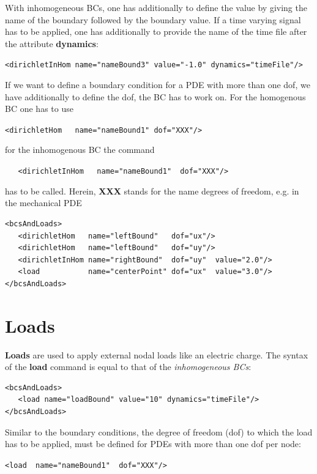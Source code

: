 With inhomogeneous BCs, one has additionally to define the value by
giving the name of the boundary followed by the boundary value. If a
time varying signal has to be applied, one has additionally to provide
the name of the time file after the attribute {\bf dynamics}:

\verb!<dirichletInHom name="nameBound3" value="-1.0" dynamics="timeFile"/>!

\noindent
If we want to define a boundary condition for a PDE with more
than one dof, we have additionally to define the dof, the BC has to
work on. For the homogenous BC one has to use

\verb!<dirichletHom   name="nameBound1" dof="XXX"/>!

\noindent
for the inhomogenous BC the command

\verb!   <dirichletInHom   name="nameBound1"  dof="XXX"/>!

\noindent
has to be called. Herein, {\bf XXX} stands for the name degrees of
freedom, e.g. in the mechanical PDE

\begin{verbatim}
<bcsAndLoads>
   <dirichletHom   name="leftBound"   dof="ux"/>
   <dirichletHom   name="leftBound"   dof="uy"/>
   <dirichletInHom name="rightBound"  dof="uy"  value="2.0"/>
   <load           name="centerPoint" dof="ux"  value="3.0"/>
</bcsAndLoads>
\end{verbatim}

\section{Loads}

{\bf Loads} are used to apply external nodal loads like an electric
charge.  The syntax of the {\bf load} command is equal to that of 
the {\em inhomogeneous BCs}:
\begin{verbatim}
<bcsAndLoads>
   <load name="loadBound" value="10" dynamics="timeFile"/>
</bcsAndLoads>
\end{verbatim}

Similar to the boundary conditions, the degree of freedom (dof) to
which the load has to be applied, must be defined for PDEs with more
than one dof per node:

\verb!<load  name="nameBound1"  dof="XXX"/>!




